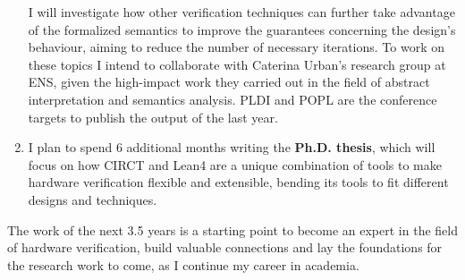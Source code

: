 \documentclass[sigconf,authorversion,nonacm, 11pt]{acmart}
\begin{document}
\begin{enumerate}
 I will investigate how other verification techniques can further take advantage of the formalized semantics to improve the 
 guarantees concerning the design’s behaviour, aiming to reduce the number of necessary iterations. 
 To work on these topics I intend to collaborate with Caterina Urban's research group at ENS, given the high-impact work 
 they carried out in the field of abstract interpretation and semantics analysis. 
 PLDI and POPL are the conference targets to publish the output of the last year. 
    \item I plan to spend 6 additional months writing the \textbf{Ph.D. thesis}, which will focus on how CIRCT and Lean4 are 
 a unique combination of tools to make hardware verification flexible and extensible, bending its tools to fit 
 different designs and techniques.
\end{enumerate}
The work of the next 3.5 years is a starting point to 
become an expert in the field of hardware verification, build valuable connections and lay the foundations for the research work to come, 
as I continue my career in academia. 

\thispagestyle{empty}


\thispagestyle{empty}
\end{document}
